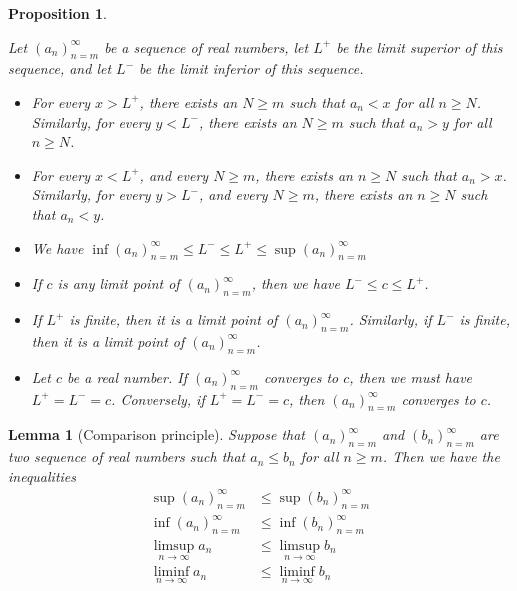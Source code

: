 \documentclass[
]{book}
\providecommand{\tightlist}{%
  \setlength{\itemsep}{0pt}\setlength{\parskip}{0pt}}
\newtheorem{lemma}{Lemma}[chapter]
\newtheorem{proposition}{Proposition}[chapter]
\theoremstyle{definition}
\theoremstyle{definition}
\theoremstyle{definition}
\theoremstyle{definition}
\theoremstyle{remark}
\begin{document}
\begin{proposition}
\protect\hypertarget{prp:em}{}\label{prp:em}

Let \((a_n)_{n=m}^{\infty}\) be a sequence of real numbers, let \(L^+\) be the limit superior of this sequence, and let \(L^-\) be the limit inferior of this sequence.

\begin{itemize}
\tightlist
\item
  For every \(x>L^+\), there exists an \(N\geq m\) such that \(a_n<x\) for all \(n\geq N\). Similarly, for every \(y<L^-\), there exists an \(N\geq m\) such that \(a_n>y\) for all \(n\geq N\).
\item
  For every \(x<L^+\), and every \(N\geq m\), there exists an \(n\geq N\) such that \(a_n>x\). Similarly, for every \(y>L^-\), and every \(N\geq m\), there exists an \(n\geq N\) such that \(a_n<y\).
\item
  We have \(\inf(a_n)_{n=m}^{\infty}\leq L^-\leq L^+\leq \sup(a_n)_{n=m}^{\infty}\)
\item
  If \(c\) is any limit point of \((a_n)_{n=m}^{\infty}\), then we have \(L^-\leq c\leq L^+\).
\item
  If \(L^+\) is finite, then it is a limit point of \((a_n)_{n=m}^{\infty}\). Similarly, if \(L^-\) is finite, then it is a limit point of \((a_n)_{n=m}^{\infty}\).
\item
  Let \(c\) be a real number. If \((a_n)_{n=m}^{\infty}\) converges to \(c\), then we must have \(L^+=L^-=c\). Conversely, if \(L^+=L^-=c\), then \((a_n)_{n=m}^{\infty}\) converges to \(c\).
\end{itemize}

\end{proposition}

\begin{lemma}[Comparison principle]
Suppose that \((a_n)_{n=m}^{\infty}\) and \((b_n)_{n=m}^{\infty}\) are two sequence of real numbers such that \(a_n\leq b_n\) for all \(n\geq m\). Then we have the inequalities
\[
\begin{aligned}
\sup (a_n)_{n=m}^{\infty} &\leq \sup (b_n)_{n=m}^{\infty}\\
\inf (a_n)_{n=m}^{\infty} &\leq \inf (b_n)_{n=m}^{\infty}\\
\limsup_{n\to\infty}a_n &\leq \limsup_{n\to\infty}b_n\\
\liminf_{n\to\infty}a_n &\leq \liminf_{n\to\infty}b_n
\end{aligned}
\]
\end{lemma}
\end{document}
